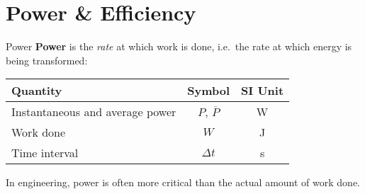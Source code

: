 \documentclass[12pt,compress,aspectratio=169]{beamer}
\begin{document}



\section{Power \& Efficiency}

\begin{frame}{Power}
  \textbf{Power} is the \emph{rate} at which work is done, i.e.\ the rate at
  which energy is being transformed:

  \begin{center}
    \begin{tabular}{l|c|c}
      \rowcolor{pink}
      \textbf{Quantity}  & \textbf{Symbol} & \textbf{SI Unit} \\ \hline
      Instantaneous and average power & $P$, $\overline P$ & \si\watt \\
      Work done          & $W$ & \si\joule \\
      Time interval      & $\Delta t$ & \si\second
    \end{tabular}
  \end{center}
  In engineering, power is often more critical than the actual amount of work
  done.
\end{frame}
\end{document}
